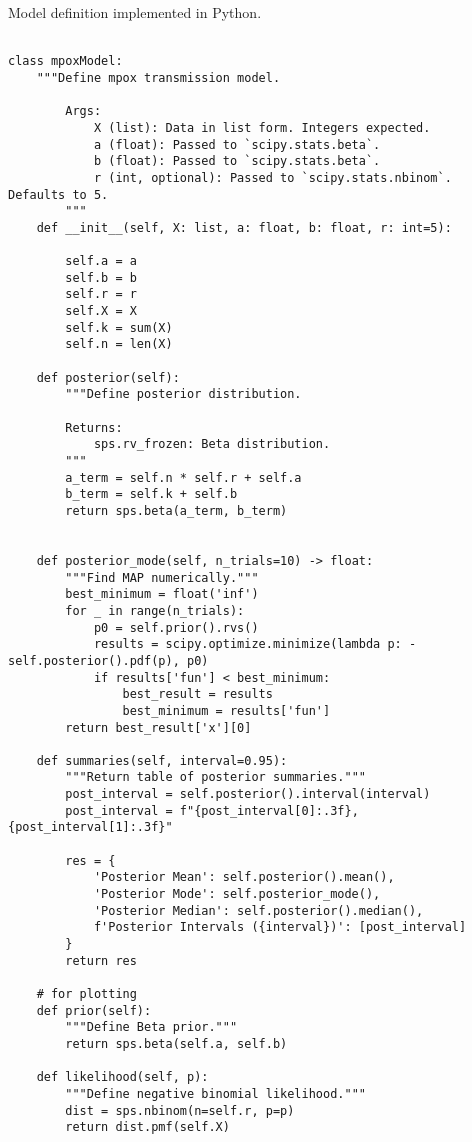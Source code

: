 Model definition implemented in Python.

\begin{verbatim}

class mpoxModel:
    """Define mpox transmission model.
    
        Args:
            X (list): Data in list form. Integers expected.
            a (float): Passed to `scipy.stats.beta`.
            b (float): Passed to `scipy.stats.beta`.
            r (int, optional): Passed to `scipy.stats.nbinom`. Defaults to 5.
        """
    def __init__(self, X: list, a: float, b: float, r: int=5):
    
        self.a = a
        self.b = b
        self.r = r
        self.X = X
        self.k = sum(X)
        self.n = len(X)

    def posterior(self):
        """Define posterior distribution.

        Returns:
            sps.rv_frozen: Beta distribution.
        """     
        a_term = self.n * self.r + self.a
        b_term = self.k + self.b
        return sps.beta(a_term, b_term)
    
    
    def posterior_mode(self, n_trials=10) -> float:
        """Find MAP numerically."""
        best_minimum = float('inf')
        for _ in range(n_trials):
            p0 = self.prior().rvs()
            results = scipy.optimize.minimize(lambda p: -self.posterior().pdf(p), p0)
            if results['fun'] < best_minimum:
                best_result = results
                best_minimum = results['fun']
        return best_result['x'][0]
    
    def summaries(self, interval=0.95):
        """Return table of posterior summaries."""
        post_interval = self.posterior().interval(interval)
        post_interval = f"{post_interval[0]:.3f}, {post_interval[1]:.3f}"

        res = {
            'Posterior Mean': self.posterior().mean(),
            'Posterior Mode': self.posterior_mode(),
            'Posterior Median': self.posterior().median(),
            f'Posterior Intervals ({interval})': [post_interval]
        }
        return res
        
    # for plotting
    def prior(self):
        """Define Beta prior."""
        return sps.beta(self.a, self.b)
    
    def likelihood(self, p):
        """Define negative binomial likelihood."""
        dist = sps.nbinom(n=self.r, p=p)
        return dist.pmf(self.X)

\end{verbatim}